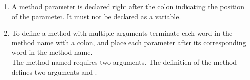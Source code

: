 \summa

\begin{enumerate}
  \item A method parameter is declared right after the colon
  indicating the position of the parameter. It must not be declared as a  variable.
  
 \item To define a method with multiple \newcommand{\remove}[1]{number of} arguments\newcommand{\add}[1]{,} terminate \newcommand{\replace}[2]{the words that compose}{each word in} the method name \newcommand{\replace}[2]{by a colon}{with a colon,} and place \newcommand{\replace}[2]{between them the parameters}{each parameter after its corresponding word in the method name}.\\
The method named  requires two arguments. The definition of the method  defines two arguments\newcommand{\add}[1]{,}  and .\end{enumerate}


\ifx\wholebook\relax\else\fi
